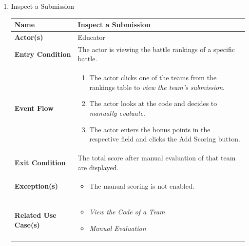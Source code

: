 \begin{enumerate}
\item Inspect a Submission
\begin{center}
    \begin{tabular}{ | m{10em} | m{10cm}| } 
      \hline
      \textbf{Name} & Inspect a Submission \\ 
      \hline
      \textbf{Actor(s)} & Educator \\ 
      \hline
      \textbf{Entry Condition} & The actor is viewing the battle rankings of a specific battle. \\ 
      \hline
      \textbf{Event Flow} & 
          \begin{enumerate}[(1)]
              \item The actor clicks one of the teams from the rankings table to \textit{view the team's submission}.
              \item The actor looks at the code and decides to \textit{manually evaluate}.
              \item The actor enters the bonus points in the respective field and clicks the Add Scoring button.
          \end{enumerate}
      \\ 
      \hline
      \textbf{Exit Condition} & The total score after manual evaluation of that team are displayed.  \\ 
      \hline
      \textbf{Exception(s)} & 
      \begin{itemize}
          \item The manual scoring is not enabled.
      \end{itemize}
          \\ 
      \hline
      \textbf{Related Use Case(s)} & 
      \begin{itemize}
\item \textit{View the Code of a Team}
\item \textit{Manual Evaluation}
      \end{itemize}
          \\ 
      \hline
    \end{tabular}
\end{center}


\newpage



\end{enumerate}
